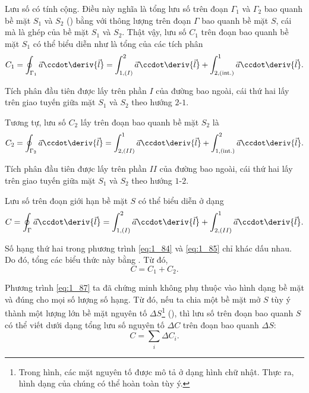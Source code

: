 Lưu số có tính cộng. Điều này nghĩa là tổng lưu số trên đoạn $\Gamma_1$ và $\Gamma_2$ bao quanh bề mặt $S_1$ và $S_2$ () bằng với thông lượng trên đoạn $\Gamma$ bao quanh bề mặt $S$, cái mà là ghép của bề mặt $S_1$ và $S_2$. Thật vậy, lưu số $C_1$ trên đoạn bao quanh bề mặt $S_1$ có thể biểu diễn như là tổng của các tích phân
\begin{equation}\label{eq:1_84}
	C_1 = \oint_{\Gamma_1} \vec{a} \ccdot \deriv{\vec{l}} = \int_{1,(I)}^2 \vec{a} \ccdot \deriv{\vec{l}} + \int_{2,(\text{int.})}^1 \vec{a} \ccdot \deriv{\vec{l}}.
\end{equation}

\noindent
Tích phân đầu tiên được lấy trên phần $I$ của đường bao ngoài, cái thứ hai lấy trên giao tuyến giữa mặt $S_1$ và $S_2$ theo hướng $2$-$1$.

Tương tự, lưu số $C_2$ lấy trên đoạn bao quanh bề mặt $S_2$ là
\begin{equation}\label{eq:1_85}
	C_2 = \oint_{\Gamma_2} \vec{a} \ccdot \deriv{\vec{l}} = \int_{2,(II)}^1 \vec{a} \ccdot \deriv{\vec{l}} + \int_{1,(\text{int.})}^2 \vec{a} \ccdot \deriv{\vec{l}}.
\end{equation}

\noindent
Tích phân đầu tiên được lấy trên phần $II$ của đường bao ngoài, cái thứ hai lấy trên giao tuyến giữa mặt $S_1$ và $S_2$ theo hướng $1$-$2$.

Lưu số trên đoạn giới hạn bề mặt $S$ có thể biểu diễn ở dạng
\begin{equation}\label{eq:1_86}
	C = \oint_{\Gamma} \vec{a} \ccdot \deriv{\vec{l}} = \int_{1,(I)}^2 \vec{a} \ccdot \deriv{\vec{l}} + \int_{2,(II)}^1 \vec{a} \ccdot \deriv{\vec{l}}.
\end{equation}

\noindent
Số hạng thứ hai trong phương trình \eqref{eq:1_84} và \eqref{eq:1_85} chỉ khác dấu nhau. Do đó, tổng các biểu thức này bằng . Từ đó,
\begin{equation}\label{eq:1_87}
	C = C_1 + C_2.
\end{equation}

Phương trình \eqref{eq:1_87} ta đã chứng minh không phụ thuộc vào hình dạng bề mặt và đúng cho mọi số lượng số hạng. Từ đó, nếu ta chia một bề mặt mở $S$ tùy ý thành một lượng lớn bề mặt nguyên tố $\Delta{S}$\footnote{Trong hình, các mặt nguyên tố được mô tả ở dạng hình chữ nhật. Thực ra, hình dạng của chúng có thể hoàn toàn tùy ý.} (), thì lưu số trên đoạn bao quanh $S$ có thể viết dưới dạng tổng lưu số nguyên tố $\Delta{C}$ trên đoạn bao quanh $\Delta{S}$:
\begin{equation}\label{eq:1_88}
	C = \sum_i \Delta{C}_i.
\end{equation}

